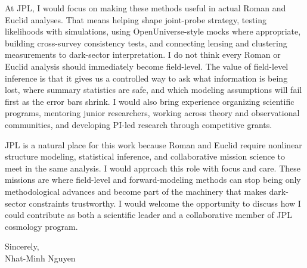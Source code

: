 \documentclass[11pt,letterpaper]{article}
\begin{document}
At JPL, I would focus on making these methods useful in actual Roman and Euclid analyses. That means helping shape joint-probe strategy, testing likelihoods with simulations, using OpenUniverse-style mocks where appropriate, building cross-survey consistency tests, and connecting lensing and clustering measurements to dark-sector interpretation. I do not think every Roman or Euclid analysis should immediately become field-level. The value of field-level inference is that it gives us a controlled way to ask what information is being lost, where summary statistics are safe, and which modeling assumptions will fail first as the error bars shrink. I would also bring experience organizing scientific programs, mentoring junior researchers, working across theory and observational communities, and developing PI-led research through competitive grants.

JPL is a natural place for this work because Roman and Euclid require nonlinear structure modeling, statistical inference, and collaborative mission science to meet in the same analysis. I would approach this role with focus and care. These missions are where field-level and forward-modeling methods can stop being only methodological advances and become part of the machinery that makes dark-sector constraints trustworthy. I would welcome the opportunity to discuss how I could contribute as both a scientific leader and a collaborative member of JPL cosmology program.

\vspace{0.18cm}
Sincerely, \\
Nhat-Minh Nguyen
\end{document}

